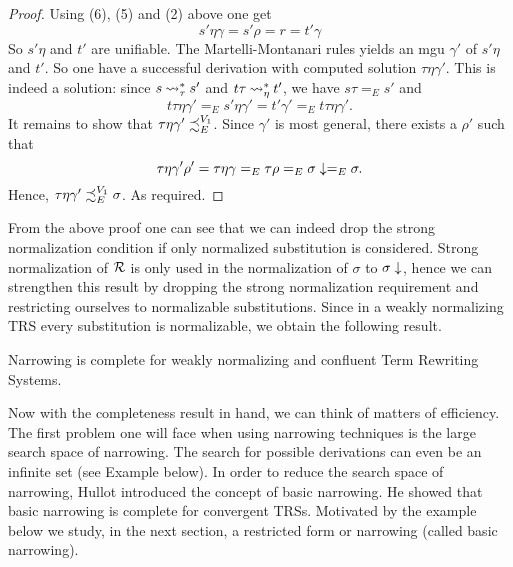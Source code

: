 \begin{theorem}
\begin{proof}
        Using (6), (5) and (2) above one get
        $$s'\eta\gamma = s'\rho = r = t'\gamma$$
        So $s'\eta$ and $t'$ are unifiable. The Martelli-Montanari rules yields an mgu $\gamma'$ of $s'\eta$ and $t'$. So one have a successful derivation with computed solution $\tau \eta \gamma'$. This is indeed a solution: since $s \mathbin{\rightsquigarrow}_{\tau}^* s'$ and $t\tau \mathbin{\rightsquigarrow}_{\eta}^{*} t'$, we have $s\tau =_E s'$ and
        $$t\tau \eta \gamma' =_E s'\eta\gamma' = t'\gamma' =_E t\tau\eta\gamma'.$$
        It remains to show that $\tau\eta \gamma' \iqoless[E][V_1]$. Since $\gamma'$ is most general, there exists a $\rho'$ such that
        $$\tau \eta \gamma' \rho' = \tau \eta \gamma =_E \tau \rho =_E \sigma\downarrow =_E \sigma.$$
        Hence, $\tau \eta \gamma' \iqoless[E][V_1] \sigma$. As required.
    \end{proof}
    From the above proof one can see that we can indeed drop the strong normalization condition if only normalized substitution is considered. Strong normalization of $\mathcal{R}$ is only used in the normalization of $\sigma$ to $\sigma\downarrow$, hence we can strengthen this result by dropping the strong normalization requirement and restricting ourselves to normalizable substitutions. Since in a weakly normalizing TRS every substitution is normalizable, we obtain the following result.
    \begin{corollary}
        Narrowing is complete for weakly normalizing and confluent Term Rewriting Systems.
    \end{corollary}
\end{theorem}

Now with the completeness result in hand, we can think of matters of efficiency. The first problem one will face when using narrowing techniques is the large search space of narrowing. The search for possible derivations can even be an infinite set (see Example below). In order to reduce the search space of narrowing, Hullot \cite{hullot:cfunif} introduced the concept of basic narrowing. He showed that basic narrowing is complete for convergent TRSs. Motivated by the example below we study, in the next section, a restricted form or narrowing (called basic narrowing).

